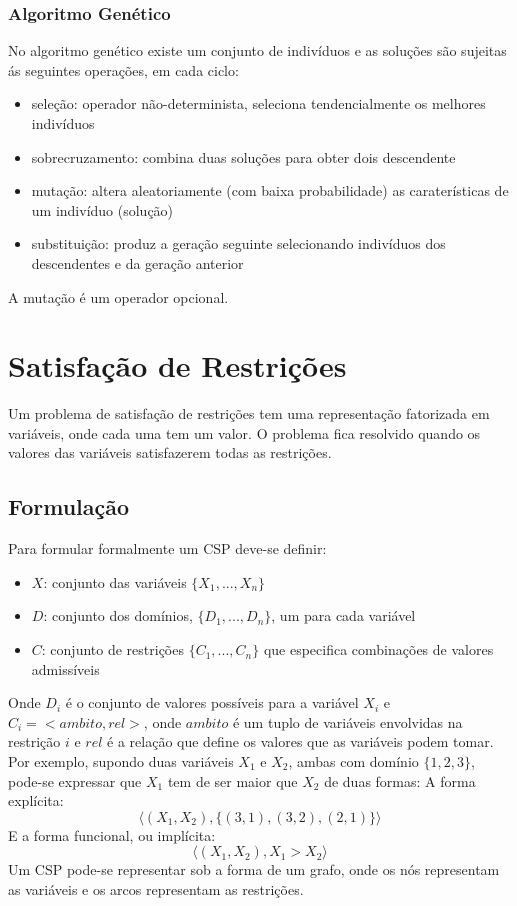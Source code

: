 \documentclass[10pt,a4paper]{report}
\begin{document}
\subsection{Algoritmo Genético}
No algoritmo genético existe um conjunto de indivíduos e as soluções são sujeitas ás seguintes operações, em cada ciclo:
\begin{itemize}
\item seleção: operador não-determinista, seleciona tendencialmente os melhores indivíduos
\item sobrecruzamento: combina duas soluções para obter dois descendente
\item mutação: altera aleatoriamente (com baixa probabilidade) as caraterísticas de um indivíduo (solução)
\item substituição: produz a geração seguinte selecionando indivíduos dos descendentes e da geração anterior
\end{itemize}
A mutação é um operador opcional.

\chapter{Satisfação de Restrições}
Um problema de satisfação de restrições tem uma representação fatorizada em variáveis, onde cada uma tem um valor. O problema fica resolvido quando os valores das variáveis satisfazerem todas as restrições.
\section{Formulação}
Para formular formalmente um CSP deve-se definir:
\begin{itemize}
\item $X$: conjunto das variáveis $\{X_1,...,X_n\}$
\item $D$: conjunto dos domínios, $\{D_1,...,D_n\}$, um para cada variável
\item $C$: conjunto de restrições $\{C_1,...,C_n\}$ que especifica combinações de valores admissíveis
\end{itemize}
Onde $D_i$ é o conjunto de valores possíveis para a variável $X_i$ e $C_i = <ambito,rel>$, onde $ambito$ é um tuplo de variáveis envolvidas na restrição $i$ e $rel$ é a relação que define os valores que as variáveis podem tomar. Por exemplo, supondo duas variáveis $X_1$ e $X_2$, ambas com domínio $\{1,2,3\}$, pode-se expressar que $X_1$ tem de ser maior que $X_2$ de duas formas: A forma explícita:
$$
\langle (X_1,X_2),\{(3,1),(3,2),(2,1)\} \rangle
$$
E a forma funcional, ou implícita:
$$
\langle (X_1,X_2), X_1 > X_2 \rangle
$$
Um CSP pode-se representar sob a forma de um grafo, onde os nós representam as variáveis e os arcos representam as restrições.
\end{document}
